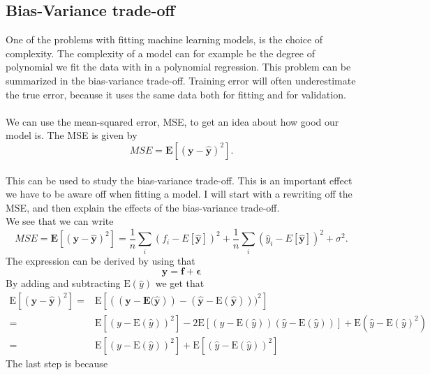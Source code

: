\subsection{Bias-Variance trade-off}
One of the problems with fitting machine learning models, is the choice of complexity. The complexity of a model can for example be the degree of polynomial we fit the data with in a polynomial regression. This problem can be summarized in the bias-variance trade-off. 
Training error will often underestimate the true error, because it uses the same data both for fitting and for validation.\cite{hastie} 
\\
\\
We can use the mean-squared error, MSE, to get an idea about how good our model is. The MSE is given by 
\begin{equation}
MSE = \boldsymbol{E}[(\boldsymbol{y} - \boldsymbol{\hat{y}})^2].
\end{equation}
\\
This can be used to study the bias-variance trade-off. This is an important effect we have to be aware off when fitting a model. I will start with a rewriting off the MSE, and then explain the effects of the bias-variance trade-off. 
\\
We see that we can write 
\begin{equation}
MSE = \boldsymbol{E}[(\boldsymbol{y} - \boldsymbol{\hat{y}})^2] = \frac{1}{n}\sum_i(f_i - E[\boldsymbol{\hat{y}}])^2 + \frac{1}{n}\sum_i(\hat{y}_i - E[\boldsymbol{\hat{y}}])^2 + \sigma^2.
\label{eq:bias_variance}
\end{equation}
The expression can be derived by using that 
\begin{equation}
    \boldsymbol{y} = \boldsymbol{f + \epsilon}
\end{equation}
By adding and subtracting $\text{E}(\hat{y})$ we get that
\begin{equation}
\begin{split}
\text{E}[(\boldsymbol{y - \hat{y}})^2] = & \text{E}[((\boldsymbol{y - \text{E}(\hat{y}})) - (\hat{\boldsymbol{y}} - \text{E}(\boldsymbol{\hat{y}})))^2]\\
= & \text{E}[(y-\text{E}(\hat{y}))^2] - 2\text{E}[(y-\text{E}(\hat{y}))(\hat{y}-\text{E}(\hat{y}))] + \text{E}(\hat{y} - \text{E}(\hat{y})^2) \\
= & \text{E}[(y-\text{E}(\hat{y}))^2] + \text{E}[(\hat{y} - \text{E}(\hat{y}))^2]
\end{split}
\end{equation}
The last step is because
